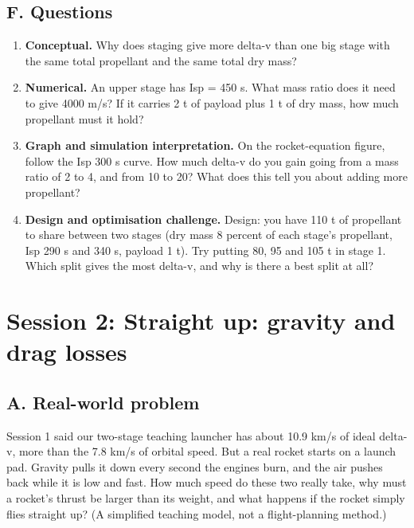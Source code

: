 \documentclass[11pt,a4paper]{article}
\begin{document}
\subsection*{F. Questions}
\begin{enumerate}[nosep]
\item \textbf{Conceptual.} Why does staging give more delta-v than one big stage with the same total propellant and the same total dry mass?
\item \textbf{Numerical.} An upper stage has Isp = 450 s. What mass ratio does it need to give 4000 m/s? If it carries 2 t of payload plus 1 t of dry mass, how much propellant must it hold?
\item \textbf{Graph and simulation interpretation.} On the rocket-equation figure, follow the Isp 300 s curve. How much delta-v do you gain going from a mass ratio of 2 to 4, and from 10 to 20? What does this tell you about adding more propellant?
\item \textbf{Design and optimisation challenge.} Design: you have 110 t of propellant to share between two stages (dry mass 8 percent of each stage's propellant, Isp 290 s and 340 s, payload 1 t). Try putting 80, 95 and 105 t in stage 1. Which split gives the most delta-v, and why is there a best split at all?
\end{enumerate}

\section{Session 2: Straight up: gravity and drag losses}

\subsection*{A. Real-world problem}
Session 1 said our two-stage teaching launcher has about 10.9 km/s of ideal delta-v, more than the 7.8 km/s of orbital speed. But a real rocket starts on a launch pad. Gravity pulls it down every second the engines burn, and the air pushes back while it is low and fast. How much speed do these two really take, why must a rocket's thrust be larger than its weight, and what happens if the rocket simply flies straight up? (A simplified teaching model, not a flight-planning method.)
\end{document}

